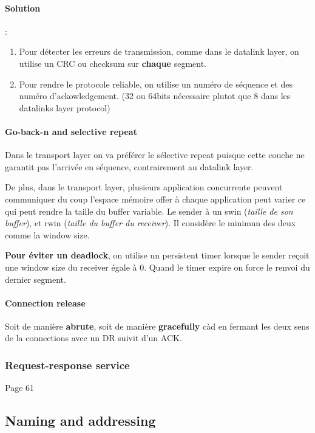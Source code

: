\paragraph{Solution} :
\begin{enumerate}
    \item Pour détecter les erreurs de transmission, comme dans le datalink layer, on utilise un
    CRC ou checksum sur \textbf{chaque} segment.
    \item Pour rendre le protocole reliable, on utilise un numéro de séquence et des numéro
    d'ackowledgement. (32 ou 64bits nécessaire plutot que 8 dans les datalinks layer protocol)
\end{enumerate}

\paragraph{Go-back-n and selective repeat}
Dans le transport layer on va préférer le sélective repeat puisque cette couche
ne garantit pas l'arrivée en séquence, contrairement au datalink layer.

De plus, dans le transport layer, plusieurs application concurrente peuvent communiquer
du coup l'espace mémoire offer à chaque application peut varier ce qui peut rendre la
taille du buffer variable.
Le sender à un swin (\textit{taille de son buffer}), et rwin (\textit{taille du buffer du receiver}). Il considère le minimun des deux comme la window size.


\textbf{Pour éviter un deadlock}, on utilise un persistent timer lorsque le sender reçoit une
window size du receiver égale à 0. Quand le timer expire on force le renvoi du dernier segment.

\paragraph{Connection release}
Soit de manière \textbf{abrute}, soit de manière \textbf{gracefully} càd en fermant
les deux sens de la connections avec un DR suivit d'un ACK.


\subsubsection{Request-response service}

Page 61

\subsection{Naming and addressing}

